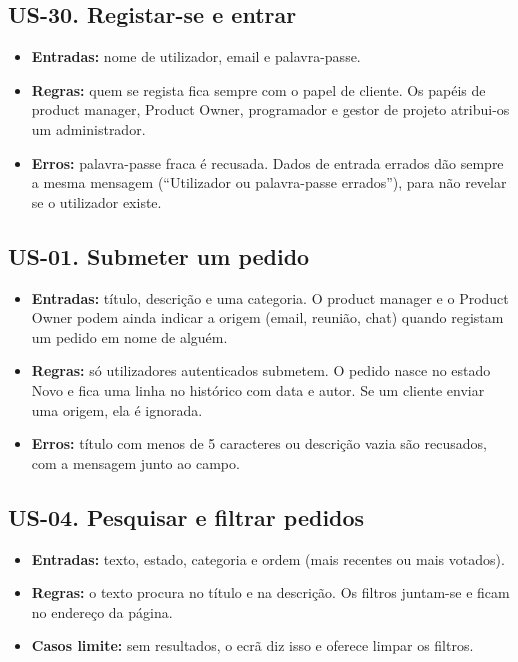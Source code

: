 \documentclass[11pt,a4paper]{article}
\begin{document}
\subsection{US-30. Registar-se e entrar}

\begin{itemize}
\item \textbf{Entradas:} nome de utilizador, email e palavra-passe.
\item \textbf{Regras:} quem se regista fica sempre com o papel de cliente. Os papéis de product manager, Product Owner, programador e gestor de projeto atribui-os um administrador.
\item \textbf{Erros:} palavra-passe fraca é recusada. Dados de entrada errados dão sempre a mesma mensagem (``Utilizador ou palavra-passe errados''), para não revelar se o utilizador existe.
\end{itemize}

\subsection{US-01. Submeter um pedido}

\begin{itemize}
\item \textbf{Entradas:} título, descrição e uma categoria. O product manager e o Product Owner podem ainda indicar a origem (email, reunião, chat) quando registam um pedido em nome de alguém.
\item \textbf{Regras:} só utilizadores autenticados submetem. O pedido nasce no estado Novo e fica uma linha no histórico com data e autor. Se um cliente enviar uma origem, ela é ignorada.
\item \textbf{Erros:} título com menos de 5 caracteres ou descrição vazia são recusados, com a mensagem junto ao campo.
\end{itemize}

\subsection{US-04. Pesquisar e filtrar pedidos}

\begin{itemize}
\item \textbf{Entradas:} texto, estado, categoria e ordem (mais recentes ou mais votados).
\item \textbf{Regras:} o texto procura no título e na descrição. Os filtros juntam-se e ficam no endereço da página.
\item \textbf{Casos limite:} sem resultados, o ecrã diz isso e oferece limpar os filtros.
\end{itemize}
\end{document}
